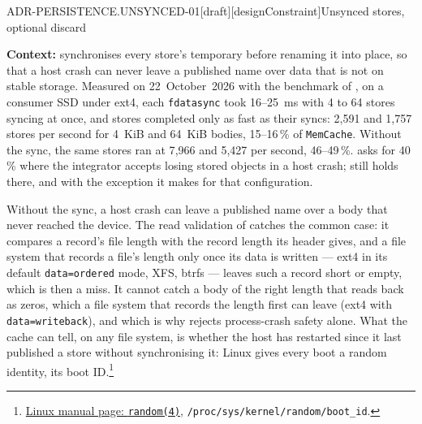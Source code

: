 \begin{requirement}{ADR-PERSISTENCE.UNSYNCED-01}[draft][designConstraint]{Unsynced stores, optional discard}


  \textbf{Context:}  synchronises every
  store's temporary before renaming it into place, so that a host crash can
  never leave a published name over data that is not on stable storage.
  Measured on 22~October~2026 with the benchmark of
  , on a consumer SSD under ext4, each
  \texttt{fdatasync} took 16--25~ms with 4 to 64 stores syncing at once, and
  stores completed only as fast as their syncs: 2{,}591 and 1{,}757 stores per
  second for 4~KiB and 64~KiB bodies, 15--16\,\% of \texttt{MemCache}.
  Without the sync, the same stores ran at 7{,}966 and 5{,}427 per second,
  46--49\,\%.  asks for 40\,\% where the
  integrator accepts losing stored objects in a host crash;
   still holds there, and
   with the exception it makes for that
  configuration.

  Without the sync, a host crash can leave a published name over a body that
  never reached the device. The read validation of
   catches the common case: it compares a
  record's file length with the record length its header gives, and a file
  system that records a file's length only once its data is written --- ext4
  in its default \texttt{data=ordered} mode, XFS, btrfs --- leaves such a
  record short or empty, which is then a miss. It cannot catch a body of the
  right length that reads back as zeros, which a file system that records the
  length first can leave (ext4 with \texttt{data=writeback}), and which is
  why  rejects process-crash safety
  alone. What the cache can tell, on any file system, is whether the host has
  restarted since it last published a store without synchronising it: Linux
  gives every boot a random identity, its boot
  ID.\footnote{\href{https://man7.org/linux/man-pages/man4/random.4.html}{Linux
  manual page: \texttt{random(4)}}, \texttt{/proc/sys/kernel/random/boot\_id}.}


\end{requirement}
